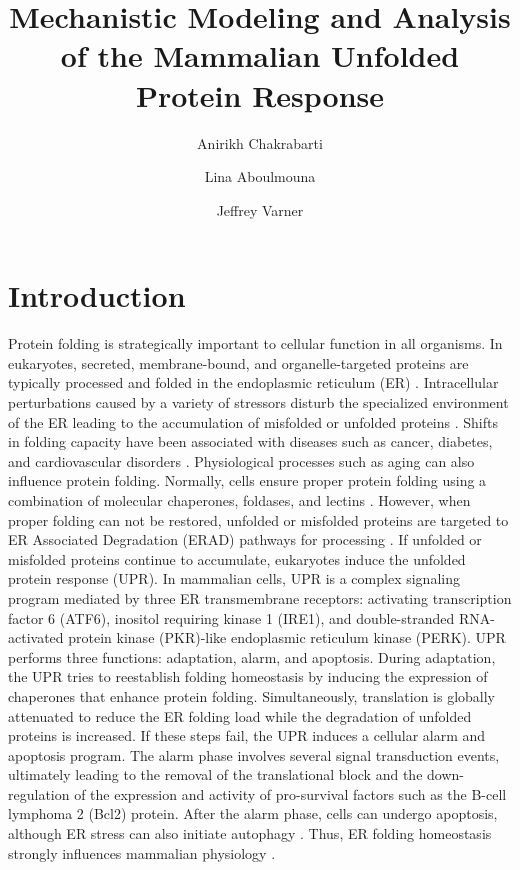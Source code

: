 \documentclass[fleqn,10pt]{wlscirep}
\title{Mechanistic Modeling and Analysis of the Mammalian Unfolded Protein Response}
\author[1]{Anirikh Chakrabarti}
\author[2]{Lina Aboulmouna}
\author[1,2,*]{Jeffrey Varner}
\affil[1]{Cornell University, School of Chemical and Biomolecular Engineering, Cornell University, Ithaca, NY 14853, USA}
\affil[2]{Purdue University, School of Chemical Engineering, West Lafayette, IN 47907, USA}
\affil[*]{jdv27@cornell.edu}
\begin{document}
\flushbottom
\maketitle

%
%
\thispagestyle{empty}


\section*{Introduction}
Protein folding is strategically important to cellular function in all organisms.
In eukaryotes, secreted, membrane-bound, and organelle-targeted proteins are typically processed and folded in the endoplasmic reticulum (ER) \cite{naidoo2009er, ron2002translational, kaufman2002unfolded}.
Intracellular perturbations caused by a variety of stressors disturb the specialized environment of the ER leading to the accumulation of misfolded or unfolded proteins \cite{ellgaard2003qce,Fonseca:2009fk}.
Shifts in folding capacity have been associated with diseases such as cancer, diabetes, and cardiovascular disorders \cite{ellgaard2003qce}. Physiological processes such as aging can also influence protein folding.
Normally, cells ensure proper protein folding using a combination of molecular chaperones, foldases, and lectins \cite{naidoo2009er}.
However, when proper folding can not be restored, unfolded or misfolded proteins are targeted to ER Associated Degradation (ERAD) pathways for processing \cite{kaufman2002unfolded}.
If unfolded or misfolded proteins continue to accumulate, eukaryotes induce the unfolded protein response (UPR).
In mammalian cells, UPR is a complex signaling program mediated by three ER transmembrane receptors: activating transcription factor 6 (ATF6), inositol requiring kinase 1 (IRE1), and double-stranded RNA-activated protein kinase (PKR)-like endoplasmic reticulum kinase (PERK).
UPR performs three functions: adaptation, alarm, and apoptosis. During adaptation, the UPR tries to reestablish folding homeostasis by inducing the expression of chaperones that enhance protein folding.
Simultaneously, translation is globally attenuated to reduce the ER folding load while the degradation of unfolded proteins is increased. If these steps fail, the UPR induces a cellular alarm and apoptosis program.
The alarm phase involves several signal transduction events, ultimately leading to the removal of the translational block and the down-regulation of the expression and activity of pro-survival factors such as the B-cell lymphoma 2 (Bcl2) protein.
After the alarm phase, cells can undergo apoptosis, although ER stress can also initiate autophagy \cite{ogata2006aac, yorimitsu2006ers, bernales2006ace, kamimoto2006iic, hoyerhansen2007cmc, kouroku2006esp, fujita2007ter}.
Thus, ER folding homeostasis strongly influences mammalian physiology \cite{Fonseca:2009fk}.
\end{document}
